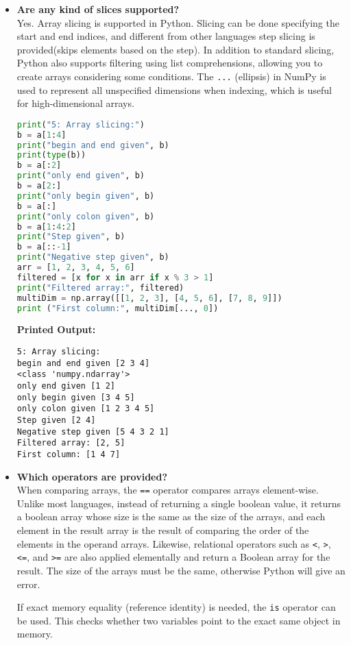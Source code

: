 \documentclass{article}
\begin{document}
\begin{itemize}
\item \textbf{Are any kind of slices supported?} \\
Yes. Array slicing is supported in Python. Slicing can be done specifying the start and end indices, and different from other languages step slicing is provided(skips elements based on the step). In addition to standard slicing, Python also supports filtering using list comprehensions, allowing you to create arrays considering some conditions.
The \texttt{...} (ellipsis) in NumPy is used to represent all unspecified dimensions when indexing, which is useful for high-dimensional arrays.
\begin{lstlisting}[language=Python]
print("5: Array slicing:")
b = a[1:4]
print("begin and end given", b)
print(type(b))
b = a[:2]
print("only end given", b)
b = a[2:]
print("only begin given", b)
b = a[:]
print("only colon given", b)
b = a[1:4:2]
print("Step given", b)
b = a[::-1]
print("Negative step given", b)
arr = [1, 2, 3, 4, 5, 6]
filtered = [x for x in arr if x % 3 > 1]
print("Filtered array:", filtered)
multiDim = np.array([[1, 2, 3], [4, 5, 6], [7, 8, 9]])
print ("First column:", multiDim[..., 0])
\end{lstlisting}
\textbf{Printed Output:}
\begin{verbatim}
5: Array slicing:
begin and end given [2 3 4]
<class 'numpy.ndarray'>
only end given [1 2]
only begin given [3 4 5]
only colon given [1 2 3 4 5]
Step given [2 4]
Negative step given [5 4 3 2 1]
Filtered array: [2, 5]
First column: [1 4 7]
\end{verbatim}


\item \textbf{Which operators are provided?} \\
When comparing arrays, the \texttt{==} operator compares arrays element-wise. Unlike most languages, instead of returning a single boolean value, it returns a boolean array whose size is the same as the size of the arrays, and each element in the result array is the result of comparing the order of the elements in the operand arrays. Likewise, relational operators such as \texttt{<}, \texttt{>}, \texttt{<=}, and \texttt{>=} are also applied elementally and return a Boolean array for the result. The size of the arrays must be the same, otherwise Python will give an error.

If exact memory equality (reference identity) is needed, the \texttt{is} operator can be used. This checks whether two variables point to the exact same object in memory. 


\end{itemize}
\end{document}
